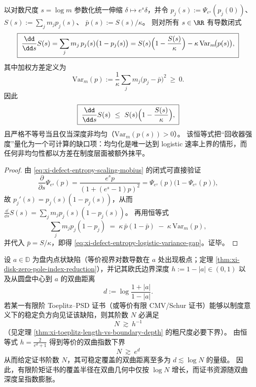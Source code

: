 \begin{proposition}\label{prop:xi-defect-entropy-scaling-variance-gap-identity}
以对数尺度 \(s=\log m\) 参数化统一伸缩 \(\delta\mapsto e^{s}\delta\)，并令
\(
p_j(s):=\Psi_{e^{s}}(p_j(0))
\)、
\(
S(s):=\sum_j m_j p_j(s)
\)、
\(
\bar p(s):=S(s)/\kappa
\)。
则对所有 \(s\in\RR\) 有导数闭式
\begin{equation}\label{eq:xi-defect-entropy-logistic-variance-gap}
\boxed{\;
\frac{\dd}{\dd s}S(s)
=\sum_j m_j\,p_j(s)\bigl(1-p_j(s)\bigr)
=S(s)\Bigl(1-\frac{S(s)}{\kappa}\Bigr)-\kappa\,\mathrm{Var}_m\!\bigl(p(s)\bigr),\;}
\end{equation}
其中加权方差定义为
\[
\mathrm{Var}_m(p):=\frac{1}{\kappa}\sum_j m_j\bigl(p_j-\bar p\bigr)^2\ \ge\ 0.
\]
因此
\[
\boxed{\;
\frac{\dd}{\dd s}S(s)\ \le\ S(s)\Bigl(1-\frac{S(s)}{\kappa}\Bigr),\;}
\]
且严格不等号当且仅当深度非均匀（\(\mathrm{Var}_m(p(s))>0\)）。
该恒等式把“回收器强度”量化为一个可计算的缺口项：均匀化是唯一达到 logistic 速率上界的情形，而任何非均匀性都以方差在制度层面被额外抹平。
\end{proposition}

\begin{proof}
由 \eqref{eq:xi-defect-entropy-scaling-mobius} 的闭式可直接验证
\[
\frac{\partial}{\partial s}\Psi_{e^s}(p)
=\frac{e^sp}{(1+(e^s-1)p)^2}
=\Psi_{e^s}(p)\bigl(1-\Psi_{e^s}(p)\bigr),
\]
故 \(p_j'(s)=p_j(s)(1-p_j(s))\)，从而 \(\frac{\dd}{\dd s}S(s)=\sum_j m_j p_j(s)(1-p_j(s))\)。
再用恒等式
\[
\sum_j m_j p_j(1-p_j)
\;=\;
\kappa\,\bar p(1-\bar p)\;-\;\kappa\,\mathrm{Var}_m(p),
\]
并代入 \(\bar p=S/\kappa\)，即得 \eqref{eq:xi-defect-entropy-logistic-variance-gap}。证毕。
\end{proof}

\begin{corollary}\label{cor:xi-certificate-complexity-hyperbolic-exponential-law}
设 \(a\in\mathbb{D}\) 为盘内点状缺陷（等价视界对数导数在 \(a\) 处出现极点；定理 \ref{thm:xi-disk-zero-pole-index-reduction}），并记其欧氏边界深度
\(
h:=1-|a|\in(0,1)
\)
以及从圆盘中心到 \(a\) 的双曲距离
\[
d:=\log\frac{1+|a|}{1-|a|}.
\]
若某一有限阶 Toeplitz--PSD 证书（或等价有限 CMV/Schur 证书）能够以制度意义下的稳定负方向见证该缺陷，则其阶数 \(N\) 必满足
\[
\boxed{\;
N\ \gtrsim\ h^{-1}\;}
\]
（见定理 \ref{thm:xi-toeplitz-length-vs-boundary-depth} 的粗尺度必要下界）。
由恒等式 \(h=\frac{2}{e^{d}+1}\) 得到等价的双曲指数下界
\[
\boxed{\;
N\ \gtrsim\ e^{d}\;}
\]
从而给定证书阶数 \(N\)，其可稳定覆盖的双曲距离至多为 \(d\lesssim \log N\) 的量级。
因此，有限阶矩证书的覆盖半径在双曲几何中仅按 \(\log N\) 增长，而证书资源随双曲深度呈指数膨胀。
\end{corollary}

